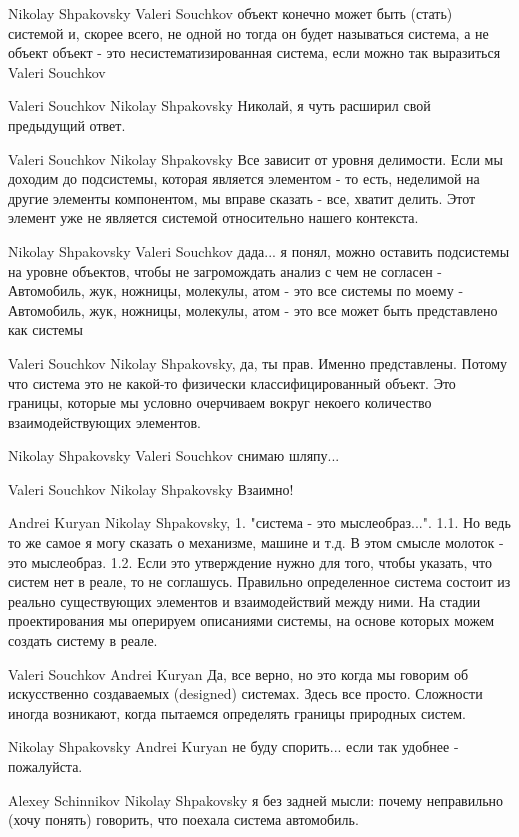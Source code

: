 \documentclass[11pt,a4paper]{article}
\begin{document}
Nikolay Shpakovsky Valeri Souchkov объект конечно может быть (стать) системой
и, скорее всего, не одной но тогда он будет называться система, а не объект
объект - это несистематизированная система, если можно так выразиться 
Valeri Souchkov

Valeri Souchkov Nikolay Shpakovsky Николай, я чуть расширил свой предыдущий
ответ.

Valeri Souchkov Nikolay Shpakovsky Все зависит от уровня делимости. Если мы
доходим до подсистемы, которая является элементом - то есть, неделимой на
другие элементы компонентом, мы вправе сказать - все, хватит делить. Этот
элемент уже не является системой относительно нашего контекста.  

Nikolay Shpakovsky Valeri Souchkov дада... я понял, можно оставить подсистемы
на уровне объектов, чтобы не загромождать анализ с чем не согласен -
Автомобиль, жук, ножницы, молекулы, атом - это все системы по моему -
Автомобиль, жук, ножницы, молекулы, атом - это все может быть представлено как
системы

Valeri Souchkov Nikolay Shpakovsky, да, ты прав. Именно представлены. Потому
что система это не какой-то физически классифицированный объект. Это границы,
которые мы условно очерчиваем вокруг некоего количество взаимодействующих
элементов.

Nikolay Shpakovsky Valeri Souchkov снимаю шляпу...

Valeri Souchkov Nikolay Shpakovsky Взаимно!

Andrei Kuryan Nikolay Shpakovsky, 1. "система - это мыслеобраз...".  1.1. Но
ведь то же самое я могу сказать о механизме, машине и т.д. В этом смысле
молоток - это мыслеобраз.  1.2. Если это утверждение нужно для того, чтобы
указать, что систем нет в реале, то не соглашусь. Правильно определенное
система состоит из реально существующих элементов и взаимодействий между
ними. На стадии проектирования мы оперируем описаниями системы, на основе
которых можем создать систему в реале.

Valeri Souchkov Andrei Kuryan Да, все верно, но это когда мы говорим об
искусственно создаваемых (designed) системах. Здесь все просто. Сложности
иногда возникают, когда пытаемся определять границы природных систем.  

Nikolay Shpakovsky Andrei Kuryan не буду спорить... если так удобнее -
пожалуйста.

Alexey Schinnikov Nikolay Shpakovsky я без задней мысли: почему неправильно
(хочу понять) говорить, что поехала система автомобиль.
\end{document}
